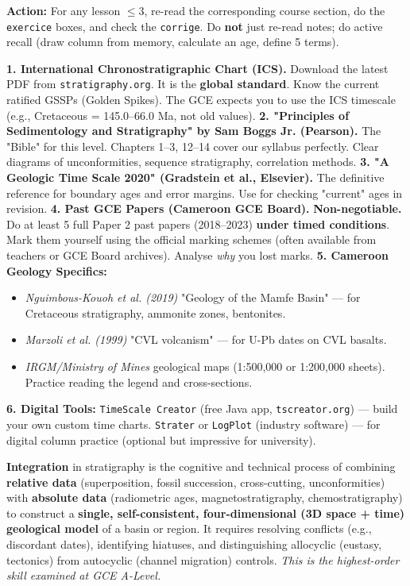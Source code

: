 \documentclass[11pt]{article}
\newcounter{popsec}
\newcounter{popsub}
\newcommand{\courssub}[1]{%
  \stepcounter{popsub}%
  \par\vspace{9pt}\noindent{\popxbold\fontsize{11.5}{13}\selectfont\color{popink}{\color{poporange}\thepopsec.\thepopsub}\hspace{6pt}#1}\par\nopagebreak\vspace{4pt}
}
\begin{document}
\textbf{Action:} For any lesson $\le 3$, re-read the corresponding course section, do the \texttt{exercice} boxes, and check the \texttt{corrige}. Do \textbf{not} just re-read notes; do active recall (draw column from memory, calculate an age, define 5 terms).

\courssub{Further Reading \& Resources}

\begin{savaistu}
\textbf{1. International Chronostratigraphic Chart (ICS).} Download the latest PDF from \texttt{stratigraphy.org}. It is the \textbf{global standard}. Know the current ratified GSSPs (Golden Spikes). The GCE expects you to use the ICS timescale (e.g., Cretaceous = 145.0--66.0 Ma, not old values).
\textbf{2. "Principles of Sedimentology and Stratigraphy" by Sam Boggs Jr. (Pearson).} The "Bible" for this level. Chapters 1--3, 12--14 cover our syllabus perfectly. Clear diagrams of unconformities, sequence stratigraphy, correlation methods.
\textbf{3. "A Geologic Time Scale 2020" (Gradstein et al., Elsevier).} The definitive reference for boundary ages and error margins. Use for checking "current" ages in revision.
\textbf{4. Past GCE Papers (Cameroon GCE Board).} \textbf{Non-negotiable.} Do at least 5 full Paper 2 past papers (2018--2023) \textbf{under timed conditions}. Mark them yourself using the official marking schemes (often available from teachers or GCE Board archives). Analyse \emph{why} you lost marks.
\textbf{5. Cameroon Geology Specifics:} 
\begin{itemize}
    \item \emph{Nguimbous-Kouoh et al. (2019)} "Geology of the Mamfe Basin" — for Cretaceous stratigraphy, ammonite zones, bentonites.
    \item \emph{Marzoli et al. (1999)} "CVL volcanism" — for U-Pb dates on CVL basalts.
    \item \emph{IRGM/Ministry of Mines} geological maps (1:500,000 or 1:200,000 sheets). Practice reading the legend and cross-sections.
\end{itemize}
\textbf{6. Digital Tools:} \texttt{TimeScale Creator} (free Java app, \texttt{tscreator.org}) — build your own custom time charts. \texttt{Strater} or \texttt{LogPlot} (industry software) — for digital column practice (optional but impressive for university).
\end{savaistu}

\begin{definition}[Integration]
\textbf{Integration} in stratigraphy is the cognitive and technical process of combining \textbf{relative data} (superposition, fossil succession, cross-cutting, unconformities) with \textbf{absolute data} (radiometric ages, magnetostratigraphy, chemostratigraphy) to construct a \textbf{single, self-consistent, four-dimensional (3D space + time) geological model} of a basin or region. It requires resolving conflicts (e.g., discordant dates), identifying hiatuses, and distinguishing allocyclic (eustasy, tectonics) from autocyclic (channel migration) controls. \emph{This is the highest-order skill examined at GCE A-Level.}
\end{definition}
\end{document}

